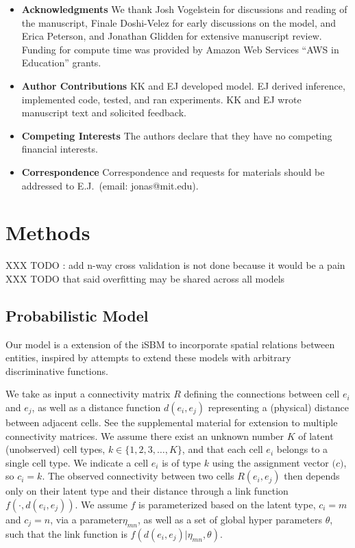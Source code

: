 \documentclass{nature}
\renewcommand{\vec}[1]{\mathbf{#1}}
\begin{document}
\begin{itemize}

 \item \textbf{Acknowledgments} We thank Josh Vogelstein for discussions and reading of the manuscript, Finale Doshi-Velez for early discussions on the model, and Erica Peterson, and Jonathan Glidden for extensive manuscript review. Funding for compute time was provided by Amazon Web Services ``AWS in Education'' grants. 
\item \textbf{Author Contributions} KK and EJ developed model. EJ derived inference, implemented code, tested, and ran experiments. KK and EJ wrote manuscript text and solicited feedback. 
 \item \textbf{Competing Interests} The authors declare that they have no
competing financial interests.
 \item \textbf{Correspondence} Correspondence and requests for materials
should be addressed to E.J.~(email: jonas@mit.edu).
\end{itemize}

\newpage
\section{Methods }
XXX TODO : add n-way cross validation is not done because it would be a pain
XXX TODO that said overfitting may be shared across all models 

\subsection{Probabilistic Model}

Our model is a extension of the iSBM
\autocite{Kemp2006a,Xu2006} to incorporate spatial relations between entities,
inspired by attempts to extend these models with arbitrary
discriminative functions\autocite{Murphy2012}.

We take as input a connectivity matrix $R$ defining the connections
between cell $e_i$ and $e_j$, as well as a distance function $d(e_i,
e_j)$ representing a (physical) distance between adjacent cells. See
the supplemental material for extension to multiple connectivity
matrices. We assume there exist an unknown number $K$ of latent
(unobserved) cell types, $k \in \{1, 2, 3, \dots, K\}$, and that each
cell $e_i$ belongs to a single cell type. We indicate a cell $e_i$ is
of type $k$ using the assignment vector $\vec(c)$, so $c_i = k$. The
observed connectivity between two cells $R(e_i, e_j)$ then depends
only on their latent type and their distance through a link function
$f(\cdot, d(e_i, e_j))$. We assume $f$ is parameterized based on the
latent type, $c_i=m$ and $c_j=n$, via a parameter$\eta_{mn}$, as well
as a set of global hyper parameters $\theta$, such that the link
function is $f(d(e_i, e_j) | \eta_{mn}, \theta)$. 
\end{document}
